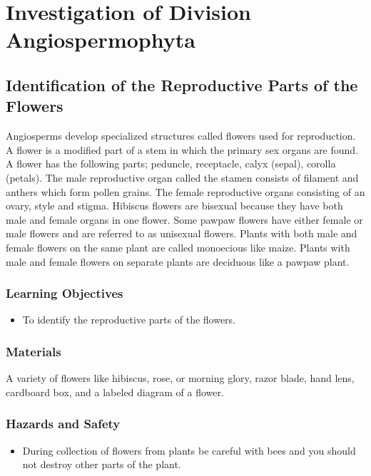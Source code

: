 \section{Investigation of Division Angiospermophyta}

\subsection{Identification of the Reproductive Parts of the Flowers}
Angiosperms develop specialized structures called flowers used for reproduction. A flower is a modified part of a stem in which the primary sex organs are found. A flower has the following parts; peduncle, receptacle, calyx (sepal), corolla (petals). The male reproductive organ called the stamen consists of filament and anthers which form pollen grains. The female reproductive organs consisting of an ovary, style and stigma. Hibiscus flowers are bisexual because they have both male and female organs in one flower. Some pawpaw flowers have either female or male flowers and are referred to as unisexual flowers. Plants with both male and female flowers on the same plant are called monoecious like maize. Plants with male and female flowers on separate plants are deciduous like a pawpaw plant.

\subsubsection*{Learning Objectives}
\begin{itemize}
\item{To identify the reproductive parts of the flowers.}
\end{itemize}

\subsubsection*{Materials}
A variety of flowers like hibiscus, rose, or morning glory, razor blade, hand lens, cardboard box, and a labeled diagram of a flower.

\subsubsection*{Hazards and Safety}
\begin{itemize}
\item{During collection of flowers from plants be careful with bees and you should not destroy other parts of the plant.}
\end{itemize}

